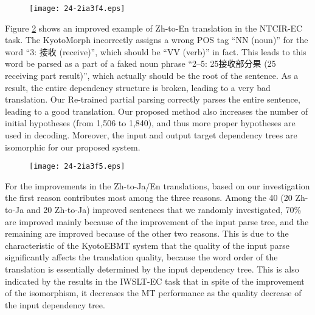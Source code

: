 \documentclass[english]{jnlp_1.4}
\begin{document}
\begin{figure}[t]
\begin{center}
\texttt{[image: 24-2ia3f4.eps]}
\end{center}
\label{fig:zh_ja_improved}
\end{figure}


Figure \ref{fig:zh_en_improved} shows an improved example of Zh-to-En translation {in the NTCIR-EC task}. The KyotoMorph 
incorrectly assigns a wrong POS tag ``NN (noun)'' for the word ``3: 接收 (receive)'', which should be 
``VV (verb)'' in fact. This leads to this word be parsed as a part of a faked noun phrase 
``2--5: 25接收部分果 (25 receiving part result)'', which actually 
should be the root of the sentence. As a result, the entire dependency structure is broken, leading
to a very bad translation. Our Re-trained partial parsing correctly parses the entire sentence, leading 
to a good translation. Our proposed method also increases the number of initial hypotheses (from 1,506 to 1,840),
and thus more proper hypotheses are used in decoding. Moreover, the input and output target dependency 
trees are isomorphic for our proposed system.

\begin{figure}[t]
\begin{center}
\texttt{[image: 24-2ia3f5.eps]}
\end{center}
\label{fig:zh_en_improved}
\vspace{-1\Cvs}
\end{figure}

{For the improvements in the Zh-to-Ja/En translations, based on our investigation
the first reason contributes most among the three reasons. {Among the
40 (20 Zh-to-Ja and 20 Zh-to-Ja) improved sentences that we randomly investigated, 70\% are
improved mainly because of the improvement of the input parse tree, and the remaining are 
improved because of the other two reasons.} This is due to the characteristic
of the KyotoEBMT system that the quality of the input parse significantly
affects the translation quality, because the word order of the translation is essentially
determined by the input dependency tree. This is also indicated by the results
in the IWSLT-EC task that in spite of the improvement of the isomorphism, it 
decreases the MT performance as the quality decrease of the input dependency tree.}
\end{document}
